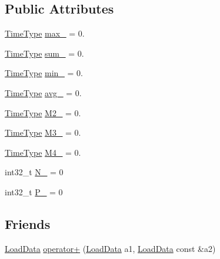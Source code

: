 \subsection*{Public Attributes}
\begin{DoxyCompactItemize}
\item 
\hyperlink{namespacevt_a876a9d0cd5a952859c72de8a46881442}{Time\+Type} \hyperlink{structvt_1_1vrt_1_1collection_1_1balance_1_1_load_data_ab40f4437905013cad01f9cd2dcc2325b}{max\+\_\+} = 0.
\item 
\hyperlink{namespacevt_a876a9d0cd5a952859c72de8a46881442}{Time\+Type} \hyperlink{structvt_1_1vrt_1_1collection_1_1balance_1_1_load_data_ab20f34a82481f573b8db44d7d2f9111c}{sum\+\_\+} = 0.
\item 
\hyperlink{namespacevt_a876a9d0cd5a952859c72de8a46881442}{Time\+Type} \hyperlink{structvt_1_1vrt_1_1collection_1_1balance_1_1_load_data_a2ce7f969bd102daebb5071f5a3da8396}{min\+\_\+} = 0.
\item 
\hyperlink{namespacevt_a876a9d0cd5a952859c72de8a46881442}{Time\+Type} \hyperlink{structvt_1_1vrt_1_1collection_1_1balance_1_1_load_data_a3e0f760e59dfb3d80cedac64d36d2e4f}{avg\+\_\+} = 0.
\item 
\hyperlink{namespacevt_a876a9d0cd5a952859c72de8a46881442}{Time\+Type} \hyperlink{structvt_1_1vrt_1_1collection_1_1balance_1_1_load_data_a04e4244881beaca49025897e5620ed07}{M2\+\_\+} = 0.
\item 
\hyperlink{namespacevt_a876a9d0cd5a952859c72de8a46881442}{Time\+Type} \hyperlink{structvt_1_1vrt_1_1collection_1_1balance_1_1_load_data_a7a23cdc3dda02d87701437321537b79b}{M3\+\_\+} = 0.
\item 
\hyperlink{namespacevt_a876a9d0cd5a952859c72de8a46881442}{Time\+Type} \hyperlink{structvt_1_1vrt_1_1collection_1_1balance_1_1_load_data_a0f702910e47d58e4c5754651ecc592f2}{M4\+\_\+} = 0.
\item 
int32\+\_\+t \hyperlink{structvt_1_1vrt_1_1collection_1_1balance_1_1_load_data_a5e1f990aaaad4bfe9bf9f0a8dc4efecc}{N\+\_\+} = 0
\item 
int32\+\_\+t \hyperlink{structvt_1_1vrt_1_1collection_1_1balance_1_1_load_data_a6f221924e77d7c24d97cd41da5ff274c}{P\+\_\+} = 0
\end{DoxyCompactItemize}
\subsection*{Friends}
\begin{DoxyCompactItemize}
\item 
\hyperlink{structvt_1_1vrt_1_1collection_1_1balance_1_1_load_data}{Load\+Data} \hyperlink{structvt_1_1vrt_1_1collection_1_1balance_1_1_load_data_a1e8bed4069f5d871e42c25dbea965ff8}{operator+} (\hyperlink{structvt_1_1vrt_1_1collection_1_1balance_1_1_load_data}{Load\+Data} a1, \hyperlink{structvt_1_1vrt_1_1collection_1_1balance_1_1_load_data}{Load\+Data} const \&a2)
\end{DoxyCompactItemize}


